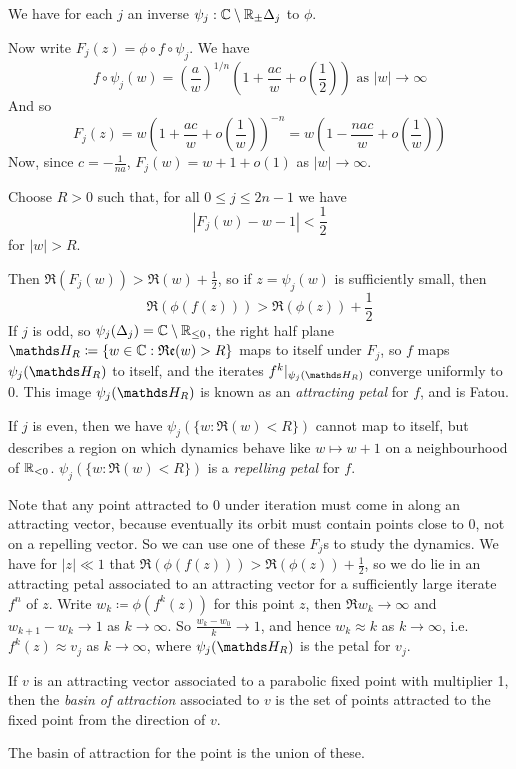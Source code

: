 \documentclass[10pt,a4paper]{article}
\begin{document}
We have for each $j$ an inverse $\psi_j : \mathbb{C}\setminus \mathbb{R}_{\pm} \Delta_j$ to $\phi$.

Now write $F_j(z) = \phi\circ f\circ \psi_j$. We have
\[f \circ \psi_j(w) = \left(\frac{a}{w}\right)^{1/n}\left(1+\frac{ac}{w}+o\left(\frac{1}{2}\right)\right) \text{ as } |w| \to \infty\]
And so
\[F_j(z) = w\left(1+\frac{ac}{w}+o\left(\frac{1}{w}\right)\right)^{-n} = w\left(1-\frac{nac}{w}+o\left(\frac{1}{w}\right)\right)\]
Now, since $c=-\frac{1}{na}$, $F_j(w) = w+1+o(1)$ as $|w|\to\infty$.

Choose $R > 0$ such that, for all $0 \leq j \leq 2n-1$ we have
\[|F_j(w)-w-1|<\frac{1}{2}\]
for $|w|>R$.

Then $\Re(F_j(w)) > \Re(w) + \frac12$, so if $z = \psi_j(w)$ is sufficiently small, then
\[\Re(\phi(f(z))) > \Re(\phi(z))+\frac12\]
If $j$ is odd, so $\psi_j(\Delta_j) = \mathbb{C}\setminus\mathbb{R}_{\leq 0}$, the right half plane $\H_R \coloneqq \{w \in \C:\Re(w)>R\}$ maps to itself under $F_j$, so $f$ maps $\psi_j(\H_R)$ to itself, and the iterates $f^k|_{\psi_j(\H_R)}$ converge uniformly to 0. This image $\psi_j(\H_R)$ is known as an \emph{attracting petal} for $f$, and is Fatou.

If $j$ is even, then we have $\psi_j(\{w:\Re(w) < R\})$ cannot map to itself, but describes a region on which dynamics behave like $w \mapsto w+1$ on a neighbourhood of $\mathbb{R}_{<0}$. $\psi_j(\{w : \Re(w) < R\})$ is a \emph{repelling petal} for $f$.

Note that any point attracted to $0$ under iteration must come in along an attracting vector, because eventually its orbit must contain points close to $0$, not on a repelling vector. So we can use one of these $F_j$s to study the dynamics. We have for $|z|\ll 1$ that $\Re(\phi(f(z))) > \Re(\phi(z)) + \frac12$, so we do lie in an attracting petal associated to an attracting vector for a sufficiently large iterate $f^n$ of $z$. Write $w_k \coloneqq \phi(f^k(z))$ for this point $z$, then $\Re w_k \to \infty$ and $w_{k+1}-w_k \to 1$ as $k \to \infty$. So $\frac{w_k-w_0}{k} \to 1$, and hence $w_k \approx k$ as $k \to \infty$, i.e. $f^k(z)\approx v_j$ as $k \to \infty$, where $\psi_j(\H_R)$ is the petal for $v_j$.

If $v$ is an attracting vector associated to a parabolic fixed point with multiplier 1, then the \emph{basin of attraction} associated to $v$ is the set of points attracted to the fixed point from the direction of $v$.

The basin of attraction for the point is the union of these.
\end{document}
